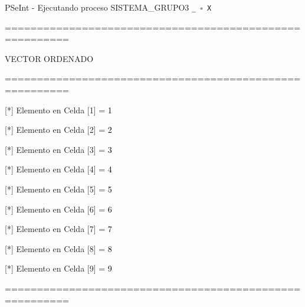 \documentclass[12pt,a4paper]{article}
\newcommand{\consola}[1]{\noindent\textcolor{pseString}{#1}}
\newcommand{\entrada}[1]{\textcolor{black}{#1}}
\newenvironment{PSeIntWindow}{%
	\begin{tcolorbox}[
		breakable,
		enhanced,
		colback=white,
		colframe=black!60,
		boxrule=0.5pt,
		arc=1mm,
		left=0mm,
		right=0mm,
		top=0mm,
		bottom=2mm,
		width=\textwidth
		]
	}{%
	\end{tcolorbox}
}
\newcommand{\BarraPSeInt}{%
	\colorbox{gray!20}{%
		\parbox{\dimexpr\textwidth-2\fboxsep\relax}{%
			\small
			\textcolor{pseString}{\faPlayCircle}
			\hspace{0.3em}
			PSeInt - Ejecutando proceso SISTEMA\_GRUPO3
			\hfill
			\texttt{\_ \hspace{0.5em} \(\square\) \hspace{0.5em} X}
		}
	}
}
\begin{document}
	\begin{PSeIntWindow}
		
		\BarraPSeInt
		
		\vspace{0.2cm}
		
		\ttfamily\small
		
		\consola{========================================================}\par
		
		\vspace{0.2cm}
		
		\consola{VECTOR ORDENADO}\par
		
		\vspace{0.2cm}
		
		\consola{========================================================}\par
		
		\vspace{0.3cm}
		
		\consola{[*] Elemento en Celda [1] = }\entrada{1}\par
		
		\consola{[*] Elemento en Celda [2] = }\entrada{2}\par
		
		\consola{[*] Elemento en Celda [3] = }\entrada{3}\par
		
		\consola{[*] Elemento en Celda [4] = }\entrada{4}\par
		
		\consola{[*] Elemento en Celda [5] = }\entrada{5}\par
		
		\consola{[*] Elemento en Celda [6] = }\entrada{6}\par
		
		\consola{[*] Elemento en Celda [7] = }\entrada{7}\par
		
		\consola{[*] Elemento en Celda [8] = }\entrada{8}\par
		
		\consola{[*] Elemento en Celda [9] = }\entrada{9}\par
		
		\vspace{0.3cm}
		
		\consola{========================================================}\par
		
		\vspace{0.3cm}
		

\end{PSeIntWindow}
\end{document}
